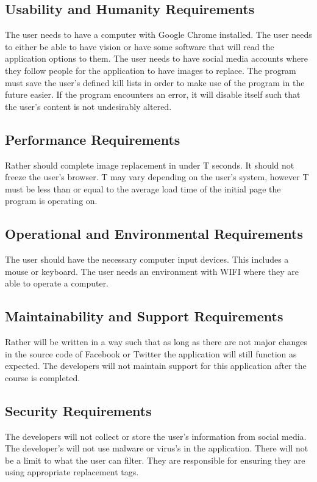 \documentclass[12pt, titlepage]{article}
\begin{document}
\subsection{Usability and Humanity Requirements}
The user needs to have a computer with Google Chrome installed. The user needs to either be able to have vision or have some software that will read the application options to them. The user needs to have social media accounts where they follow people for the application to have images to replace. The program must save the user's defined kill lists in order to make use of the program in the future easier. If the program encounters an error, it will disable itself such that the user's content is not undesirably altered.

\subsection{Performance Requirements}
Rather should complete image replacement in under T seconds. It should not freeze the user's browser. T may vary depending on the user's system, however T must be less than or equal to the average load time of the initial page the program is operating on.
\subsection{Operational and Environmental Requirements}
The user should have the necessary computer input devices. This includes a mouse or keyboard. The user needs an environment with WIFI where they are able to operate a computer.

\subsection{Maintainability and Support Requirements}
Rather will be written in a way such that as long as there are not major changes in the source code of Facebook or Twitter the application will still function as expected. The developers will not maintain support for this application after the course is completed.

\subsection{Security Requirements}
The developers will not collect or store the user's information from social media. The developer's will not use malware or virus's in the application. There will not be a limit to what the user can filter. They are responsible for ensuring they are using appropriate replacement tags. 
\end{document}
